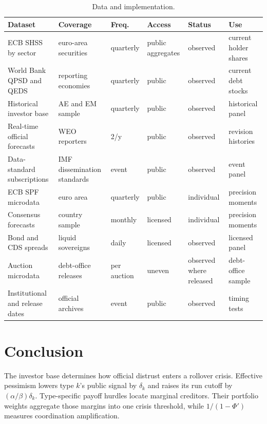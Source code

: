 \documentclass[11pt]{article}
\theoremstyle{definition}
\begin{document}
\begin{table}[t]
\centering
\caption{Data and implementation.}
\label{tab:feas5}
\footnotesize
\setlength{\tabcolsep}{4pt}
\begin{tabular}{p{3.3cm}p{2.8cm}p{1.5cm}p{1.8cm}p{2.4cm}p{1.6cm}}
\toprule
Dataset & Coverage & Freq. & Access & Status & Use \\
\midrule
ECB SHSS by sector \citep{ECBSHSSData} & euro-area securities & quarterly & public aggregates & observed & current holder shares \\
World Bank QPSD and QEDS \citep{WorldBankQPSD,WorldBankQEDS} & reporting economies & quarterly & public & observed & current debt stocks \\
Historical investor base \citep{ArslanalpTsuda2014} & AE and EM sample & quarterly & public & observed & historical panel \\
Real-time official forecasts \citep{IMFWEOData} & WEO reporters & 2/y & public & observed & revision histories \\
Data-standard subscriptions & IMF dissemination standards & event & public & observed & event panel \\
ECB SPF microdata \citep{ECBSPFData} & euro area & quarterly & public & individual & precision moments \\
Consensus forecasts & country sample & monthly & licensed & individual & precision moments \\
Bond and CDS spreads & liquid sovereigns & daily & licensed & observed & licensed panel \\
Auction microdata & debt-office releases & per auction & uneven & observed where released & debt-office sample \\
Institutional and release dates & official archives & event & public & observed & timing tests \\
\bottomrule
\end{tabular}
\end{table}

\section{Conclusion}\label{sec:conclusion}

The investor base determines how official distrust enters a rollover crisis. Effective pessimism lowers type $k$'s public signal by $\delta_k$ and raises its run cutoff by $(\alpha/\beta)\delta_k$. Type-specific payoff hurdles locate marginal creditors. Their portfolio weights aggregate those margins into one crisis threshold, while $1/(1-\Phi')$ measures coordination amplification.
\end{document}
